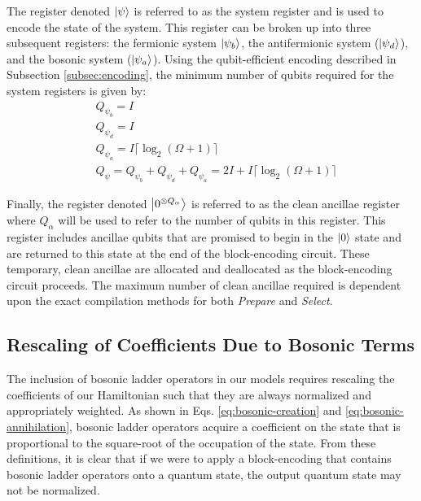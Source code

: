 The register denoted $\ket{\psi}$ is referred to as the system register and is used to encode the state of the system.
This register can be broken up into three subsequent registers: the fermionic system $\ket{\psi_b}$, the antifermionic system ($\ket{\psi_d}$), and the bosonic system ($\ket{\psi_a}$).
Using the qubit-efficient encoding described in Subsection \ref{subsec:encoding}, the minimum number of qubits required for the system registers is given by:
\begin{equation}
    \begin{split}
        &Q_{\psi_b} = I \\
        &Q_{\psi_d} = I \\
        &Q_{\psi_a} = I \lceil \log_2{(\Omega + 1)} \rceil \\
        &Q_{\psi} = Q_{\psi_b} + Q_{\psi_d} + Q_{\psi_a} = 2I + I\lceil \log_2{(\Omega + 1)} \rceil
    \end{split}
\end{equation} 

Finally, the register denoted $\ket{0^{\otimes Q_\alpha}}$ is referred to as the clean ancillae register where $Q_\alpha$ will be used to refer to the number of qubits in this register.
This register includes ancillae qubits that are promised to begin in the $\ket{0}$ state and are returned to this state at the end of the block-encoding circuit.
These temporary, clean ancillae are allocated and deallocated as the block-encoding circuit proceeds.
The maximum number of clean ancillae required is dependent upon the exact compilation methods for both \textit{Prepare} and \textit{Select}.

\subsection{Rescaling of Coefficients Due to Bosonic Terms}
\label{subsec:rescaling}

The inclusion of bosonic ladder operators in our models requires rescaling the coefficients of our Hamiltonian such that they are always normalized and appropriately weighted.
As shown in Eqs. \ref{eq:bosonic-creation} and \ref{eq:bosonic-annihilation}, bosonic ladder operators acquire a coefficient on the state that is proportional to the square-root of the occupation of the state.
From these definitions, it is clear that if we were to apply a block-encoding that contains bosonic ladder operators onto a quantum state, the output quantum state may not be normalized.

